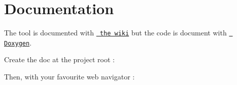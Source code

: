 \chapter{Documentation}
\hypertarget{md_docs_2README}{}\label{md_docs_2README}
\label{md_docs_2README_autotoc_md0}%
%
 The tool is documented with \href{https://github.com/GDelevoye/cigarfilter/wiki}{\texttt{ the wiki}} but the code is document with \href{https://doxygen.nl/}{\texttt{ Doxygen}}.

Create the doc at the project root \+:


\begin{DoxyCode}{0}

\end{DoxyCode}


Then, with your favourite web navigator \+:


\begin{DoxyCode}{0}

\end{DoxyCode}
 